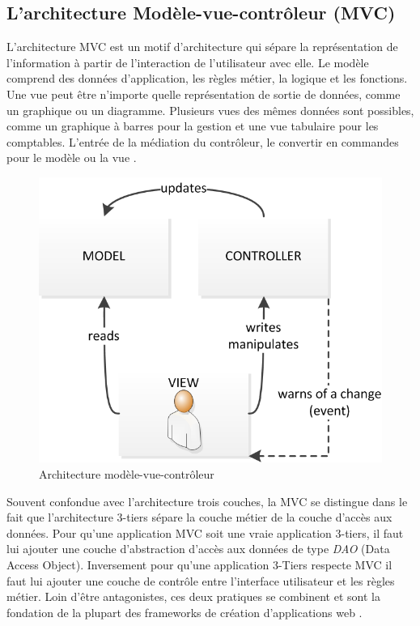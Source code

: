 \subsection{L'architecture Modèle-vue-contrôleur (MVC)}

L'architecture MVC est un motif d'architecture qui sépare la représentation de l'information à partir de l'interaction de l'utilisateur avec elle. Le modèle comprend des données d'application, les règles métier, la logique et les fonctions. Une vue peut être n'importe quelle représentation de sortie de données, comme un graphique ou un diagramme. Plusieurs vues des mêmes données sont possibles, comme un graphique à barres pour la gestion et une vue tabulaire pour les comptables. L'entrée de la médiation du contrôleur, le convertir en commandes pour le modèle ou la vue \cite{mvc}. 

\begin{figure}[hb]
\begin{center}
    \includegraphics[scale=1.0]{img/mvc}
    \caption{Architecture modèle-vue-contrôleur}
	\label{3-tier}
\end{center}
\end{figure}

Souvent confondue avec l'architecture trois couches, la MVC se distingue dans le fait que l'architecture 3-tiers sépare la couche métier de la couche d'accès aux données. Pour qu'une application MVC soit une vraie application 3-tiers, il faut lui ajouter une couche d'abstraction d'accès aux données de type \textit{DAO} (Data Access Object). Inversement pour qu'une application 3-Tiers respecte MVC il faut lui ajouter une couche de contrôle entre l'interface utilisateur et les règles métier. Loin d'être antagonistes, ces deux pratiques se combinent et sont la fondation de la plupart des frameworks de création d'applications web \cite{mvc-3-tier}.

